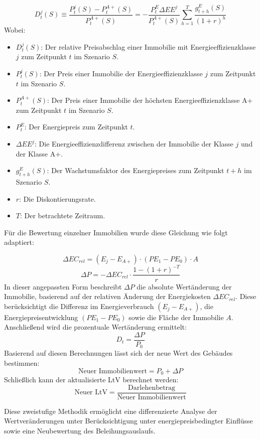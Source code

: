 \begin{equation}
D^j_t(S) \equiv \frac{P^j_t(S) - P^{A+}_t(S)}{P^{A+}_t(S)} = -\frac{P^E_t \Delta EE^j}{P^{A+}_t(S)} \sum_{h=1}^T \frac{g^E_{t+h}(S)}{(1 + r)^h}
\end{equation}
Wobei:
\begin{itemize}
    \item $D^j_t(S)$: Der relative Preisabschlag einer Immobilie mit Energieeffizienzklasse $j$ zum Zeitpunkt $t$ im Szenario $S$.
    \item $P^j_t(S)$: Der Preis einer Immobilie der Energieeffizienzklasse $j$ zum Zeitpunkt $t$ im Szenario $S$.
    \item $P^{A+}_t(S)$: Der Preis einer Immobilie der höchsten Energieeffizienzklasse A+ zum Zeitpunkt $t$ im Szenario $S$.
    \item $P^E_t$: Der Energiepreis zum Zeitpunkt $t$.
    \item $\Delta EE^j$: Die Energieeffizienzdifferenz zwischen der Immobilie der Klasse $j$ und der Klasse A+.
    \item $g^E_{t+h}(S)$: Der Wachstumsfaktor des Energiepreises zum Zeitpunkt $t+h$ im Szenario $S$.
    \item $r$: Die Diskontierungsrate.
    \item $T$: Der betrachtete Zeitraum.
\end{itemize}
Für die Bewertung einzelner Immobilien wurde diese Gleichung wie folgt adaptiert:

\begin{equation}
    \Delta EC_{rel} = (E_j - E_{A+}) \cdot (PE_1 - PE_0) \cdot A
    \end{equation}
    \begin{equation}
    \Delta P = -\Delta EC_{rel} \cdot \frac{1 - (1 + r)^{-T}}{r}
    \end{equation}
    In dieser angepassten Form beschreibt $\Delta P$ die absolute Wertänderung der Immobilie, basierend auf der relativen Änderung der Energiekosten $\Delta EC_{rel}$. Diese berücksichtigt die Differenz im Energieverbrauch $(E_j - E_{A+})$, die Energiepreisentwicklung $(PE_1 - PE_0)$ sowie die Fläche der Immobilie $A$.
    Anschließend wird die prozentuale Wertänderung ermittelt:
    \begin{equation}
    D_t = \frac{\Delta P}{P_0}
    \end{equation}
    Basierend auf diesen Berechnungen lässt sich der neue Wert des Gebäudes bestimmen:
    \begin{equation}
    \text{Neuer Immobilienwert} = P_0 + \Delta P
    \end{equation}
    Schließlich kann der aktualisierte \ac{LtV} berechnet werden:
    \begin{equation}
    \text{Neuer LtV} = \frac{\text{Darlehenbetrag}}{\text{Neuer Immobilienwert}}
    \end{equation}

Diese zweistufige Methodik ermöglicht eine differenzierte Analyse der Wertveränderungen unter Berücksichtigung unter energiepreisbedingter Einflüsse sowie eine Neubewertung des Beleihungsauslaufs.